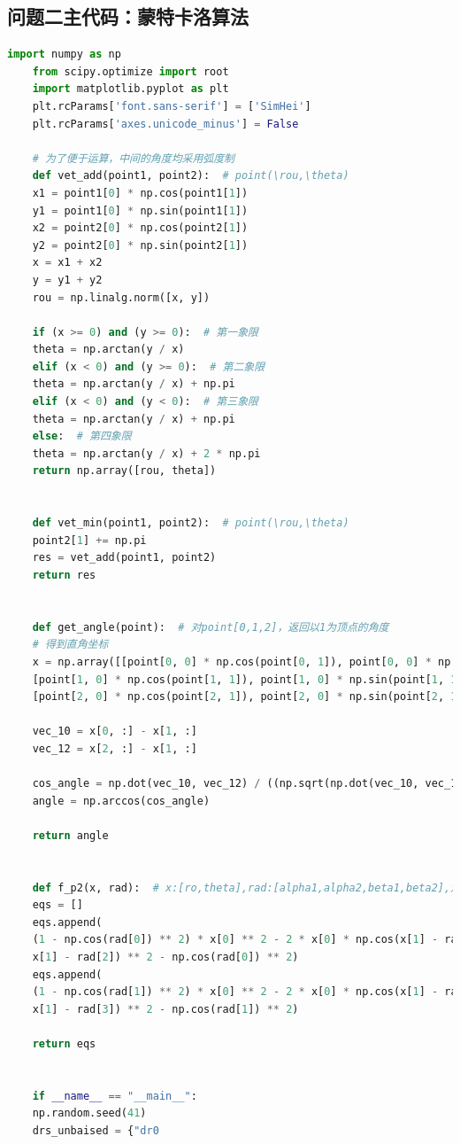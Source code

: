 \documentclass[withoutpreface,bwprint]{cumcmthesis} %
\begin{document}
	\subsection{问题二主代码：蒙特卡洛算法}
\begin{lstlisting}[language=python]
	import numpy as np
	from scipy.optimize import root
	import matplotlib.pyplot as plt
	plt.rcParams['font.sans-serif'] = ['SimHei']
	plt.rcParams['axes.unicode_minus'] = False
	
	# 为了便于运算，中间的角度均采用弧度制
	def vet_add(point1, point2):  # point(\rou,\theta)
	x1 = point1[0] * np.cos(point1[1])
	y1 = point1[0] * np.sin(point1[1])
	x2 = point2[0] * np.cos(point2[1])
	y2 = point2[0] * np.sin(point2[1])
	x = x1 + x2
	y = y1 + y2
	rou = np.linalg.norm([x, y])
	
	if (x >= 0) and (y >= 0):  # 第一象限
	theta = np.arctan(y / x)
	elif (x < 0) and (y >= 0):  # 第二象限
	theta = np.arctan(y / x) + np.pi
	elif (x < 0) and (y < 0):  # 第三象限
	theta = np.arctan(y / x) + np.pi
	else:  # 第四象限
	theta = np.arctan(y / x) + 2 * np.pi
	return np.array([rou, theta])
	
	
	def vet_min(point1, point2):  # point(\rou,\theta)
	point2[1] += np.pi
	res = vet_add(point1, point2)
	return res
	
	
	def get_angle(point):  # 对point[0,1,2]，返回以1为顶点的角度
	# 得到直角坐标
	x = np.array([[point[0, 0] * np.cos(point[0, 1]), point[0, 0] * np.sin(point[0, 1])],
	[point[1, 0] * np.cos(point[1, 1]), point[1, 0] * np.sin(point[1, 1])],
	[point[2, 0] * np.cos(point[2, 1]), point[2, 0] * np.sin(point[2, 1])]])
	
	vec_10 = x[0, :] - x[1, :]
	vec_12 = x[2, :] - x[1, :]
	
	cos_angle = np.dot(vec_10, vec_12) / ((np.sqrt(np.dot(vec_10, vec_10)) * np.sqrt(np.dot(vec_12, vec_12))) + 1e-6)
	angle = np.arccos(cos_angle)
	
	return angle
	
	
	def f_p2(x, rad):  # x:[ro,theta],rad:[alpha1,alpha2,beta1,beta2],角用弧度制表示
	eqs = []
	eqs.append(
	(1 - np.cos(rad[0]) ** 2) * x[0] ** 2 - 2 * x[0] * np.cos(x[1] - rad[2]) * (1 - np.cos(rad[0]) ** 2) + np.cos(
	x[1] - rad[2]) ** 2 - np.cos(rad[0]) ** 2)
	eqs.append(
	(1 - np.cos(rad[1]) ** 2) * x[0] ** 2 - 2 * x[0] * np.cos(x[1] - rad[3]) * (1 - np.cos(rad[1]) ** 2) + np.cos(
	x[1] - rad[3]) ** 2 - np.cos(rad[1]) ** 2)
	
	return eqs
	
	
	if __name__ == "__main__":
	np.random.seed(41)
	drs_unbaised = {"dr0
	
\end{lstlisting}
\end{document}
